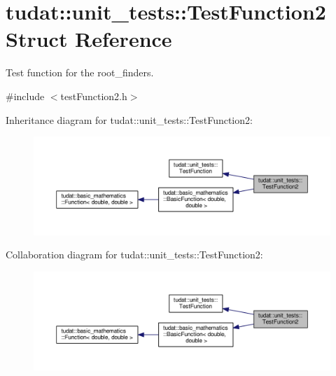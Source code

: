 \hypertarget{structtudat_1_1unit__tests_1_1TestFunction2}{}\section{tudat\+:\+:unit\+\_\+tests\+:\+:Test\+Function2 Struct Reference}
\label{structtudat_1_1unit__tests_1_1TestFunction2}


Test function for the root\+\_\+finders.  




{\ttfamily \#include $<$test\+Function2.\+h$>$}



Inheritance diagram for tudat\+:\+:unit\+\_\+tests\+:\+:Test\+Function2\+:
\nopagebreak
\begin{figure}[H]
\begin{center}
\leavevmode
\includegraphics[width=350pt]{structtudat_1_1unit__tests_1_1TestFunction2__inherit__graph}
\end{center}
\end{figure}


Collaboration diagram for tudat\+:\+:unit\+\_\+tests\+:\+:Test\+Function2\+:
\nopagebreak
\begin{figure}[H]
\begin{center}
\leavevmode
\includegraphics[width=350pt]{structtudat_1_1unit__tests_1_1TestFunction2__coll__graph}
\end{center}
\end{figure}

